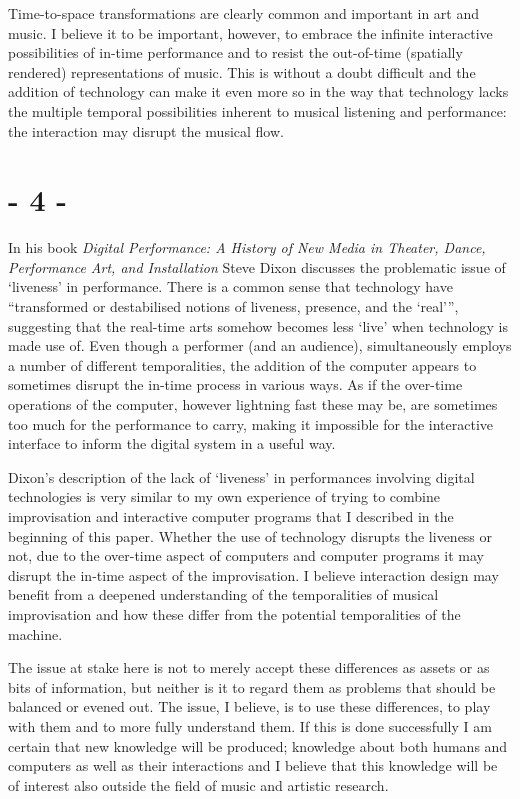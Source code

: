 \documentclass{article}
\begin{document}
Time-to-space transformations are clearly common and important in art and music. I believe it to be important, however, to embrace the infinite interactive possibilities of in-time performance and to resist the out-of-time (spatially rendered) representations of music. This is without a doubt difficult and the addition of technology can make it even more so in the way that technology lacks the multiple temporal possibilities inherent to musical listening and performance: the interaction may disrupt the musical flow.

\section*{- 4 -}
\label{sec:-4-}

In his book \emph{Digital Performance: A History of New Media in Theater, Dance, Performance Art, and Installation} Steve Dixon discusses the problematic issue of `liveness' in performance. There is a common sense that technology have ``transformed or destabilised notions of liveness, presence, and the `real''', 
\citep[127]{dixon07} suggesting that the real-time arts somehow becomes less `live' when technology is made use of. 
Even though a performer (and an audience), simultaneously employs a number of different temporalities, the addition of the computer appears to sometimes disrupt the in-time process in various ways. As if the over-time operations of the computer, however lightning fast these may be, are sometimes too much for the performance to carry, making it impossible for the interactive interface to inform the digital system in a useful way. 

Dixon's description of the lack of `liveness' in performances involving digital technologies is very similar to my own experience of trying to combine improvisation and interactive computer programs that I described in the beginning of this paper. 
Whether the use of technology disrupts the liveness or not, due to the over-time aspect of computers and computer programs it may disrupt the in-time aspect of the improvisation. 
I believe interaction design may benefit from a deepened understanding of the temporalities of musical improvisation and how these differ from the potential temporalities of the machine. 

The issue at stake here is not to merely accept these differences as assets or as bits of information, but neither is it to regard them as problems that should be balanced or evened out. The issue, I believe, is to use these differences, to play with them and to more fully understand them. If this is done successfully I am certain that new knowledge will be produced; knowledge about both humans and computers as well as their interactions and I believe that this knowledge will be of interest also outside the field of music and artistic research.



\end{document}
